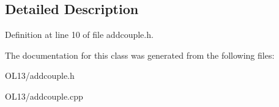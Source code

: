 \subsection{Detailed Description}


Definition at line 10 of file addcouple.\+h.



The documentation for this class was generated from the following files\+:\begin{DoxyCompactItemize}
\item 
O\+L13/addcouple.\+h\item 
O\+L13/addcouple.\+cpp\end{DoxyCompactItemize}
